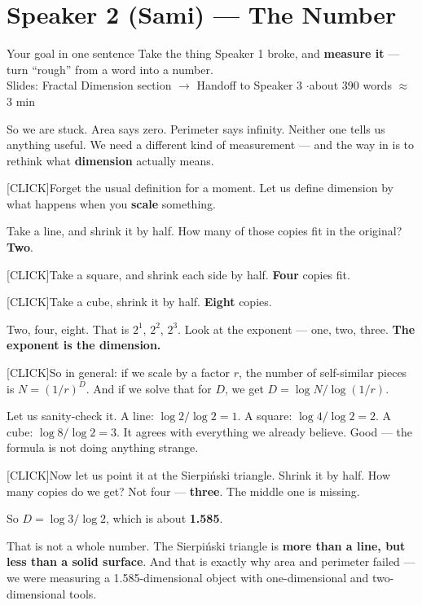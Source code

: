 \documentclass[12pt,a4paper]{article}
\newcommand{\cue}{\textcolor{RayColor}{\textsf{\footnotesize[CLICK]}}\hspace{0.3em}}
\newcommand{\stress}[1]{\textbf{#1}}
\begin{document}
\newpage
\section*{Speaker 2 (Sami) --- The Number}

\begin{speakerbox}{Your goal in one sentence}
  Take the thing Speaker 1 broke, and \stress{measure it} --- turn ``rough'' from a
  word into a number.\\[4pt]
  {\small\color{DarkGray} Slides: Fractal Dimension section $\rightarrow$
  Handoff to Speaker 3 \quad$\cdot$\quad about 390 words $\approx$ 3 min}
\end{speakerbox}

\vspace{0.3cm}

So we are stuck. Area says zero. Perimeter says infinity. Neither one tells us
anything useful. We need a different kind of measurement --- and the way in is to
rethink what \stress{dimension} actually means.

\cue Forget the usual definition for a moment. Let us define dimension by what
happens when you \stress{scale} something.

Take a line, and shrink it by half. How many of those copies fit in the original?
\stress{Two}.

\cue Take a square, and shrink each side by half. \stress{Four} copies fit.

\cue Take a cube, shrink it by half. \stress{Eight} copies.

Two, four, eight. That is $2^1$, $2^2$, $2^3$. Look at the exponent --- one, two,
three. \stress{The exponent is the dimension.}

\cue So in general: if we scale by a factor $r$, the number of self-similar pieces
is $N = (1/r)^D$. And if we solve that for $D$, we get
$D = \log N / \log(1/r)$.

Let us sanity-check it. A line: $\log 2 / \log 2 = 1$. A square:
$\log 4 / \log 2 = 2$. A cube: $\log 8 / \log 2 = 3$. It agrees with everything we
already believe. Good --- the formula is not doing anything strange.

\cue Now let us point it at the Sierpi\'nski triangle. Shrink it by half. How many
copies do we get? Not four --- \stress{three}. The middle one is missing.

So $D = \log 3 / \log 2$, which is about \stress{1.585}.

That is not a whole number. The Sierpi\'nski triangle is \stress{more than a line,
but less than a solid surface}. And that is exactly why area and perimeter failed
--- we were measuring a 1.585-dimensional object with one-dimensional and
two-dimensional tools.
\end{document}
